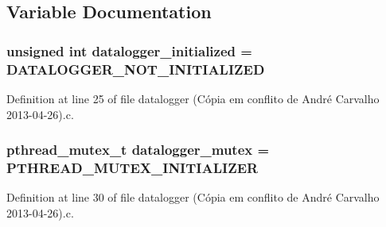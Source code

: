 \subsection{Variable Documentation}
\hypertarget{datalogger_01_07C_xC3_xB3pia_01em_01conflito_01de_01Andr_xC3_xA9_01Carvalho_012013-04-26_08_8c_a35e8fbe04b90452afdc3c1be16ff6187}{
\subsubsection[{datalogger\-\_\-initialized}]{\setlength{\rightskip}{0pt plus 5cm}unsigned int datalogger\-\_\-initialized = {\bf D\-A\-T\-A\-L\-O\-G\-G\-E\-R\-\_\-\-N\-O\-T\-\_\-\-I\-N\-I\-T\-I\-A\-L\-I\-Z\-E\-D}}}\label{datalogger_01_07C_xC3_xB3pia_01em_01conflito_01de_01Andr_xC3_xA9_01Carvalho_012013-04-26_08_8c_a35e8fbe04b90452afdc3c1be16ff6187}


Definition at line 25 of file datalogger (\-Cópia em conflito de André Carvalho 2013-\/04-\/26).\-c.

\hypertarget{datalogger_01_07C_xC3_xB3pia_01em_01conflito_01de_01Andr_xC3_xA9_01Carvalho_012013-04-26_08_8c_a824d6f7fd1d3898ba0b1100ba37875c6}{
\subsubsection[{datalogger\-\_\-mutex}]{\setlength{\rightskip}{0pt plus 5cm}pthread\-\_\-mutex\-\_\-t datalogger\-\_\-mutex = P\-T\-H\-R\-E\-A\-D\-\_\-\-M\-U\-T\-E\-X\-\_\-\-I\-N\-I\-T\-I\-A\-L\-I\-Z\-E\-R}}\label{datalogger_01_07C_xC3_xB3pia_01em_01conflito_01de_01Andr_xC3_xA9_01Carvalho_012013-04-26_08_8c_a824d6f7fd1d3898ba0b1100ba37875c6}


Definition at line 30 of file datalogger (\-Cópia em conflito de André Carvalho 2013-\/04-\/26).\-c.

